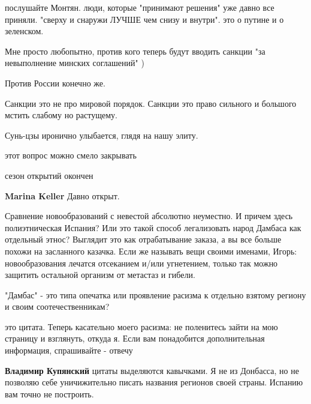 \begin{itemize}
\begin{itemize}
послушайте Монтян. люди, которые "принимают решения" уже давно все приняли.
"сверху и снаружи ЛУЧШЕ чем снизу и внутри". это о путине и о зеленском.

\end{itemize} %

Мне просто любопытно, против кого теперь будут вводить санкции "за невыполнение минских соглашений" )

\begin{itemize} %
Против России конечно же.

Санкции это не про мировой порядок. Санкции это право сильного и большого мстить слабому но растущему.
\end{itemize} %

Сунь-цзы иронично улыбается, глядя на нашу элиту.

этот вопрос можно смело закрывать

\begin{itemize} %
сезон открытий окончен

\textbf{Marina Keller} Давно открыт.
\end{itemize} %


Сравнение новообразований с невестой абсолютно неуместно. И причем здесь
полиэтническая Испания? Или это такой способ легализовать народ Дамбаса как
отдельный этнос? Выглядит это как отрабатывание заказа, а вы все больше похожи
на засланного казачка. Если же называть вещи своими именами, Игорь:
новообразования лечатся отсеканием и/или угнетением, только так можно защитить
остальной организм от метастаз и гибели.

\begin{itemize} %
"Дамбас" - это типа опечатка или проявление расизма к отдельно взятому региону и своим соотечественникам?


это цитата. Теперь касательно моего расизма: не поленитесь зайти на мою
страницу и взглянуть, откуда я. Если вам понадобится дополнительная информация,
спрашивайте - отвечу


\textbf{Владимир Купянский} цитаты выделяются кавычками. Я не из Донбасса, но не позволяю себе уничижительно писать названия регионов своей страны. Испанию вам точно не построить.


\end{itemize}
\end{itemize}
